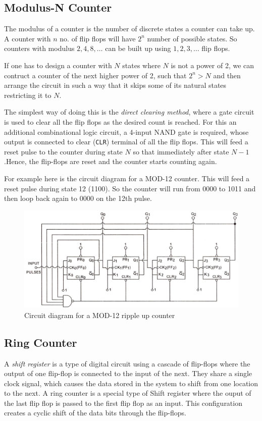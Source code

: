\subsection{Modulus-N Counter}
The modulus of a counter is the number of discrete states a counter can take up. A
counter with $n$ no. of flip flops will have $2^n$ number of possible states. So counters with
modulus $2, 4, 8,\dots$ can be built up using $1, 2, 3, \dots$ flip flops. 

If one has to design a counter with $N$ states where $N$ is not a power of 2, we can contruct a counter of the next higher power of 2, such that $2^n > N$ and then arrange the
circuit in such a way that it skips some of its natural states restricting it to $N$.

The simplest way of doing this is the \textit{direct clearing method}, where a gate circuit is used to
clear all the flip flops as the desired count is reached. For this an additional combinational logic circuit, a 4-input NAND gate is
required, whose output is connected to clear (\verb|CLR|) terminal of all the flip flops. This will feed a 
reset pulse to the counter during state $N$ so that immediately after state $N-1$.Hence, the flip-flops are reset and the counter starts counting again.

For example here is the circuit diagram for a MOD-12 counter. This will feed a reset pulse during state 12 (1100). So the counter will run from 0000 to 1011 and then loop back again to 0000 on the 12th pulse.

\begin{figure}[H]
    \centering
    \includegraphics[width=1\columnwidth]{images/mod12.png}
    \caption{Circuit diagram for a MOD-12 ripple up counter}
    \label{mod}
\end{figure}
% 
\subsection{Ring Counter}
A \textit{shift register} is a type of digital circuit using a cascade of flip-flops where the output of one flip-flop is connected to the input of the next. They share a single clock signal, which causes the data stored in the system to shift from one location to the next. A ring counter is a special type of Shift register where the ouput of the last flip flop is passed to the first flip flop as an input. This configuration creates a cyclic shift of the data bits through the flip-flops.

